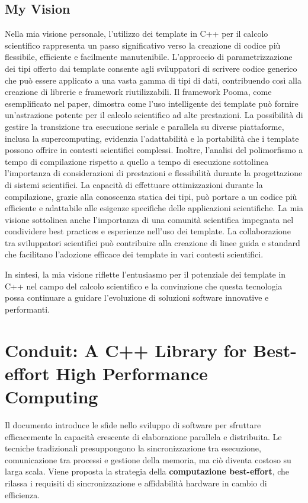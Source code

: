 \documentclass[11pt]{article}
\begin{document}
\begin{multicols*}{2}[\columnsep=1cm]
    \subsection{My Vision}
    Nella mia visione personale, l'utilizzo dei template in C++ per il calcolo scientifico rappresenta un passo significativo verso la creazione di codice più flessibile, efficiente e facilmente manutenibile. L'approccio di parametrizzazione dei tipi offerto dai template consente agli sviluppatori di scrivere codice generico che può essere applicato a una vasta gamma di tipi di dati, contribuendo così alla creazione di librerie e framework riutilizzabili.
    Il framework Pooma, come esemplificato nel paper, dimostra come l'uso intelligente dei template può fornire un'astrazione potente per il calcolo scientifico ad alte prestazioni. La possibilità di gestire la transizione tra esecuzione seriale e parallela su diverse piattaforme, inclusa la supercomputing, evidenzia l'adattabilità e la portabilità che i template possono offrire in contesti scientifici complessi.
    Inoltre, l'analisi del polimorfismo a tempo di compilazione rispetto a quello a tempo di esecuzione sottolinea l'importanza di considerazioni di prestazioni e flessibilità durante la progettazione di sistemi scientifici. La capacità di effettuare ottimizzazioni durante la compilazione, grazie alla conoscenza statica dei tipi, può portare a un codice più efficiente e adattabile alle esigenze specifiche delle applicazioni scientifiche.
    La mia visione sottolinea anche l'importanza di una comunità scientifica impegnata nel condividere best practices e esperienze nell'uso dei template. La collaborazione tra sviluppatori scientifici può contribuire alla creazione di linee guida e standard che facilitano l'adozione efficace dei template in vari contesti scientifici.

    In sintesi, la mia visione riflette l'entusiasmo per il potenziale dei template in C++ nel campo del calcolo scientifico e la convinzione che questa tecnologia possa continuare a guidare l'evoluzione di soluzioni software innovative e performanti.

\section{Conduit: A C++ Library for Best-effort High Performance Computing}
Il documento introduce le sfide nello sviluppo di software per sfruttare efficacemente la capacità crescente di elaborazione parallela e distribuita. 
Le tecniche tradizionali presuppongono la sincronizzazione tra esecuzione, comunicazione tra processi e gestione della memoria, ma ciò diventa costoso su larga scala. 
Viene proposta la strategia della \textbf{computazione best-effort}, che rilassa i requisiti di sincronizzazione e affidabilità hardware in cambio di efficienza.


\end{multicols*}
\end{document}
